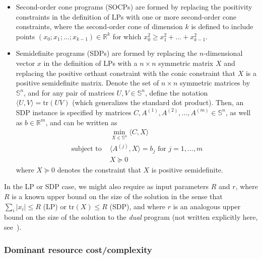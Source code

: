 \begin{refsection}
\begin{itemize}
\item
Second-order cone programs (SOCPs) are formed by replacing the positivity constraints in the definition of LPs with one or more second-order cone constraints, where the second-order cone of dimension $k$ is defined to include points $(x_0;x_1;\ldots;x_{k-1}) \in \mathbb{R}^k$ for which $x_0^2 \geq x_1^2+\ldots + x_{k-1}^2$. 
\item Semidefinite programs (SDPs) are formed by replacing the $n$-dimensional vector $x$ in the definition of LPs with a $n \times n$ symmetric matrix $X$ and replacing the positive orthant constraint with the conic constraint that $X$ is a positive semidefinite matrix. Denote the set of $n \times n$ symmetric matrices by $\mathbb{S}^n$, and for any pair of matrices $U,V \in \mathbb{S}^n$, define the notation $\langle U, V\rangle  = \text{tr}(UV)$ (which generalizes the standard dot product). Then, an SDP instance is specified by matrices $C, A^{(1)},A^{(2)},\ldots, A^{(m)} \in \mathbb{S}^n$, as well as $b \in \mathbb{R}^m$, and can be written as
\begin{equation}\label{eq:SDP}
    \begin{split}
        &\min_{X \in \mathbb{S}^n} \langle C, X \rangle \\
        \text{subject to } & \langle A^{(j)}, X\rangle = b_j \text{ for } j = 1,\ldots,m \\
        & X \succeq 0
    \end{split}
\end{equation}
where $X\succeq 0$ denotes the constraint that $X$ is positive semidefinite. 
\end{itemize}
In the LP or SDP case, we might also require as input parameters $R$ and $r$, where $R$ is a known upper bound on the size of the solution in the sense that $\sum_i |x_i| \leq R$ (LP) or $\text{tr}(X) \leq R$ (SDP), and where $r$ is an analogous upper bound on the size of the solution to the \emph{dual} program (not written explicitly here, see~\cite{apeldoorn2018ImprovedQSDPSolving}).


\subsubsection*{Dominant resource cost/complexity}


\end{refsection}
